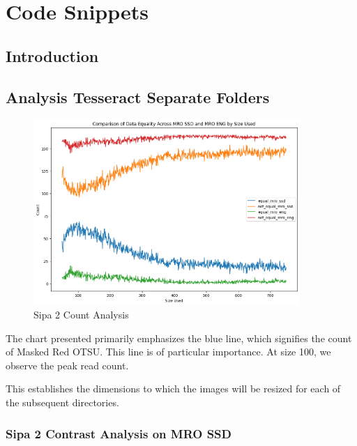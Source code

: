 \chapter{Code Snippets}


\section{Introduction}

\section{Analysis Tesseract Separate Folders}


\begin{figure}[ht]
    \centering
    \includegraphics[width=0.9\textwidth]{Figures/Results/sipa_02/count_analysis.png}
    \caption[Count Analysis]{Sipa 2 Count Analysis}
    \label{fig:Sipa 2 Count Analysis}
\end{figure}

The chart presented primarily emphasizes the blue line, which signifies the count of Masked Red OTSU. This line is of particular importance. At size 100, we observe the peak read count.

This establishes the dimensions to which the images will be resized for each of the subsequent directories.


\newpage

\subsection{Sipa 2 Contrast Analysis on MRO SSD}


